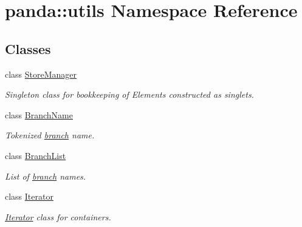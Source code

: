 \hypertarget{namespacepanda_1_1utils}{
\section{panda::utils Namespace Reference}
\label{namespacepanda_1_1utils}
}
\subsection*{Classes}
\begin{DoxyCompactItemize}
\item 
class \hyperlink{classpanda_1_1utils_1_1StoreManager}{StoreManager}
\begin{DoxyCompactList}\small\item\em Singleton class for bookkeeping of Elements constructed as singlets. \item\end{DoxyCompactList}\item 
class \hyperlink{classpanda_1_1utils_1_1BranchName}{BranchName}
\begin{DoxyCompactList}\small\item\em Tokenized \hyperlink{namespacepanda_1_1branch}{branch} name. \item\end{DoxyCompactList}\item 
class \hyperlink{classpanda_1_1utils_1_1BranchList}{BranchList}
\begin{DoxyCompactList}\small\item\em List of \hyperlink{namespacepanda_1_1branch}{branch} names. \item\end{DoxyCompactList}\item 
class \hyperlink{classpanda_1_1utils_1_1Iterator}{Iterator}
\begin{DoxyCompactList}\small\item\em \hyperlink{classpanda_1_1utils_1_1Iterator}{Iterator} class for containers. \item\end{DoxyCompactList}\end{DoxyCompactItemize}
